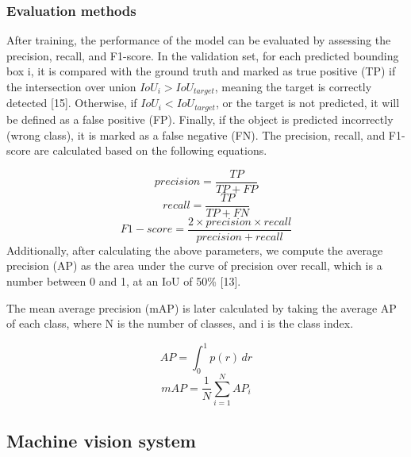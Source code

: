 \documentclass[10pt, letterpaper]{article}
\begin{document}
\subsubsection*{Evaluation methods}
    After training, the performance of the model can be evaluated by assessing the precision, recall, and F1-score. In the validation set, for each predicted bounding box i, it is compared with the ground truth and marked as true positive (TP) if the intersection over union \(IoU_i>IoU_{target}\), meaning the target is correctly detected [15]. Otherwise, if \(IoU_i < IoU_{target}\), or the target is not predicted, it will be defined as a false positive (FP). Finally, if the object is predicted incorrectly (wrong class), it is marked as a false negative (FN). The precision, recall, and F1-score are calculated based on the following equations.\par
    \begin{equation} \label{eq1} precision = \frac{TP}{TP + FP} \end{equation}
    \begin{equation} \label{eq2} recall = \frac{TP}{TP + FN} \end{equation}
    \begin{equation} \label{eq3} F1-score = \frac{2 \times precision \times recall}{precision + recall} \end{equation}
    Additionally, after calculating the above parameters, we compute the average precision (AP) as the area under the curve of precision over recall, which is a number between 0 and 1, at an IoU of 50\% [13]. \par
    The mean average precision (mAP) is later calculated by taking the average AP of each class, where N is the number of classes, and i is the class index.\par
    \begin{equation} \label{eq4} AP = \int_{0}^{1} p(r)\,dr \end{equation}
    \begin{equation} \label{eq5} mAP = \frac{1}{N} \sum_{i=1}^{N} AP_i \end{equation}

\subsection{Machine vision system}
\end{document}

